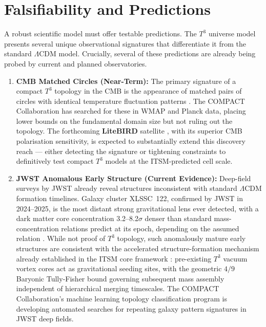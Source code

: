 \documentclass[aps,prd,11pt,onecolumn,superscriptaddress,nofootinbib,floatfix]{revtex4-2}
\begin{document}
\section{Falsifiability and Predictions}
\label{sec:predictions}

A robust scientific model must offer testable predictions. The $T^3$ universe model presents several unique observational signatures that differentiate it from the standard $\Lambda$CDM model. Crucially, several of these predictions are already being probed by current and planned observatories.

\begin{enumerate}

\item \textbf{CMB Matched Circles (Near-Term):} The primary signature of a compact $T^3$ topology in the CMB is the appearance of matched pairs of circles with identical temperature fluctuation patterns \cite{compact_pt1}. The COMPACT Collaboration has searched for these in WMAP and Planck data, placing lower bounds on the fundamental domain size but not ruling out the topology. The forthcoming \textbf{LiteBIRD} satellite \cite{litebird_2020}, with its superior CMB polarisation sensitivity, is expected to substantially extend this discovery reach --- either detecting the signature or tightening constraints to definitively test compact $T^3$ models at the ITSM-predicted cell scale.

\item \textbf{JWST Anomalous Early Structure (Current Evidence):} Deep-field surveys by JWST already reveal structures inconsistent with standard $\Lambda$CDM formation timelines. Galaxy cluster XLSSC~122, confirmed by JWST in 2024--2025, is the most distant strong gravitational lens ever detected, with a dark matter core concentration 3.2--8.2$\sigma$ denser than standard mass-concentration relations predict at its epoch, depending on the assumed relation \cite{finner_2025}. While not proof of $T^3$ topology, such anomalously mature early structures are consistent with the accelerated structure-formation mechanism already established in the ITSM core framework \cite{itsm_main}: pre-existing $T^3$ vacuum vortex cores act as gravitational seeding sites, with the geometric $4/9$ Baryonic Tully-Fisher bound governing subsequent mass assembly independent of hierarchical merging timescales. The COMPACT Collaboration's machine learning topology classification program \cite{compact_ml} is developing automated searches for repeating galaxy pattern signatures in JWST deep fields.


\end{enumerate}
\end{document}
